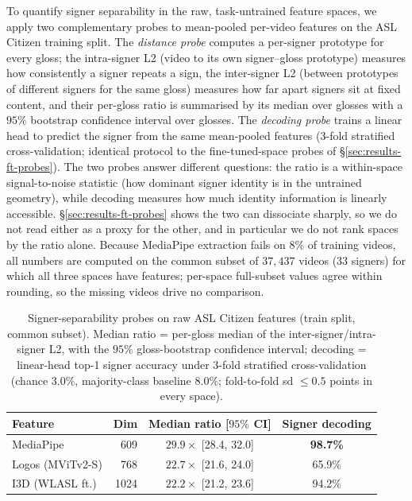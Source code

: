 To quantify signer separability in the raw, task-untrained feature spaces,
we apply two complementary probes to mean-pooled per-video features on the
ASL Citizen training split. The \emph{distance probe} computes a per-signer
prototype for every gloss; the intra-signer L2 (video to its own
signer--gloss prototype) measures how consistently a signer repeats a sign,
the inter-signer L2 (between prototypes of different signers for the same
gloss) measures how far apart signers sit at fixed content, and their
per-gloss ratio is summarised by its median over glosses with a $95\%$
bootstrap confidence interval over glosses. The \emph{decoding probe}
trains a linear head to predict the signer from the same mean-pooled
features (3-fold stratified cross-validation; identical protocol to the
fine-tuned-space probes of \S\ref{sec:results-ft-probes}). The two probes
answer different questions: the ratio is a within-space signal-to-noise
statistic (how dominant signer identity is in the untrained geometry),
while decoding measures how much identity information is linearly
accessible. \S\ref{sec:results-ft-probes} shows the two can dissociate
sharply, so we do not read either as a proxy for the other, and in
particular we do not rank spaces by the ratio alone. Because MediaPipe
extraction fails on $8\%$ of training videos, all numbers are computed on
the common subset of $37{,}437$ videos ($33$ signers) for which all three
spaces have features; per-space full-subset values agree within rounding,
so the missing videos drive no comparison.

\begin{table}[t]
\centering\footnotesize
\caption[Signer-separability probes on raw ASL Citizen features]{Signer-separability probes on raw ASL Citizen features (train
split, common subset). Median ratio = per-gloss median of the
inter-signer/intra-signer L2, with the $95\%$ gloss-bootstrap confidence
interval; decoding = linear-head top-1 signer accuracy under 3-fold
stratified cross-validation (chance $3.0\%$, majority-class baseline
$8.0\%$; fold-to-fold sd $\leq 0.5$ points in every space).}
\label{tab:raw_feature_l2_probe}
\begin{tabular}{lrcc}
\toprule
Feature & Dim & Median ratio [$95\%$ CI] & Signer decoding \\
\midrule
MediaPipe        &  609 & $29.9\times$ [28.4, 32.0] & \textbf{98.7\%} \\
Logos (MViTv2-S) &  768 & $22.7\times$ [21.6, 24.0] & 65.9\% \\
I3D (WLASL ft.)  & 1024 & $22.2\times$ [21.2, 23.6] & 94.2\% \\
\bottomrule
\end{tabular}
\end{table}

